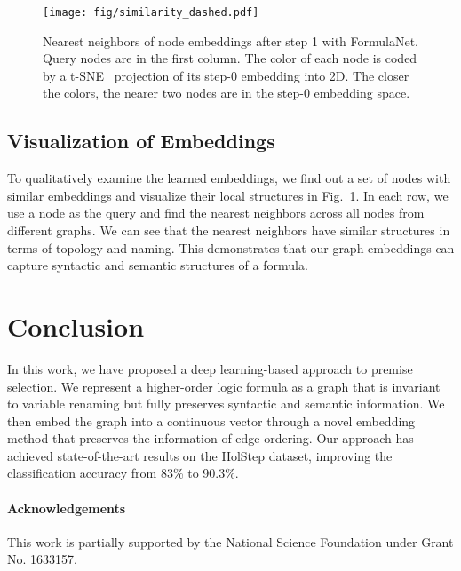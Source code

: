 \documentclass{article}
\begin{document}
\begin{figure}[b]
	\centering
	\texttt{[image: fig/similarity\_dashed.pdf]}
	\caption{Nearest neighbors of
          node embeddings after step 1 with FormulaNet. Query nodes are in the first
          column. The color of each node is coded by a t-SNE~\cite{maaten2008visualizing} projection of its
          step-0 embedding into  2D. The closer the colors,  the nearer two nodes are in
          the step-0 embedding space. }
	\label{fig:nearestneighbor}
	\vspace{-4mm}
\end{figure}
\subsection{Visualization of Embeddings}

To qualitatively examine the learned embeddings, we find out a set of nodes with
similar embeddings and visualize their local structures in
Fig.~\ref{fig:nearestneighbor}. In each row, we use a node as the query and find the
nearest neighbors across all nodes from different graphs. We can see that the nearest neighbors have similar
structures in terms of topology and naming. This demonstrates that our
graph embeddings can capture syntactic and semantic structures of a formula. 



\section{Conclusion}
In this work, we have proposed a deep learning-based approach to premise selection. We represent a higher-order logic formula
as a graph that is invariant to variable renaming but fully preserves syntactic and
semantic information. We then embed the graph into a continuous vector through a novel
embedding method that preserves the information of edge ordering. Our approach has achieved
 state-of-the-art results on the HolStep dataset, improving the classification accuracy from 83\% to 90.3\%.

\paragraph{Acknowledgements}
This work is partially supported by the National Science Foundation under Grant No. 1633157.
\end{document}
